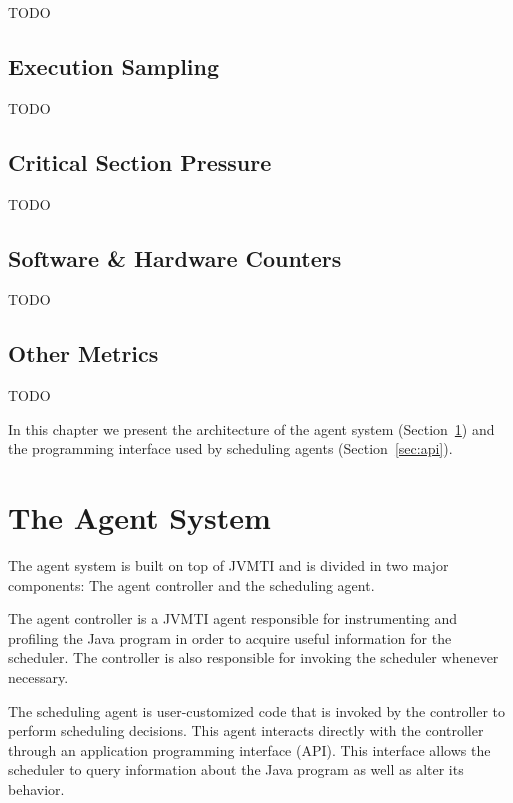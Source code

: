 TODO

\subsection{Execution Sampling}

TODO

\subsection{Critical Section Pressure}

TODO

\subsection{Software \& Hardware Counters}

TODO

\subsection{Other Metrics}


TODO

\iffalse
In this chapter we present the architecture of the agent system (Section~\ref{sec:agentsystem}) and the programming interface used by scheduling agents (Section~\ref{sec:api}).

\section{The Agent System} \label{sec:agentsystem}

The agent system is built on top of JVMTI and is divided in two major components: The agent controller and the scheduling agent.

The agent controller is a JVMTI agent responsible for instrumenting and profiling the Java program in order to acquire useful information for the scheduler. The controller is also responsible for invoking the scheduler whenever necessary.

The scheduling agent is user-customized code that is invoked by the controller to perform scheduling decisions. This agent interacts directly with the controller through an application programming interface (API). This interface allows the scheduler to query information about the Java program as well as alter its behavior.


